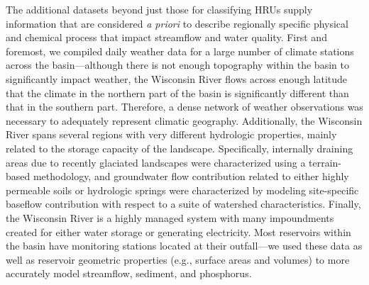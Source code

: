 The additional datasets beyond just those for classifying HRUs supply
information that are considered \textit{a priori} to describe regionally
specific physical and chemical process that impact streamflow and water quality.
First and foremost, we compiled daily weather data for a large number of climate
stations across the basin---although there is not enough topography within the
basin to significantly impact weather, the Wisconsin River flows across enough
latitude that the climate in the northern part of the basin is significantly
different than that in the southern part. Therefore, a dense network of weather
observations was necessary to adequately represent climatic geography.
Additionally, the Wisconsin River spans several regions with very different
hydrologic properties, mainly related to the storage capacity of the landscape.
Specifically, internally draining areas due to recently glaciated landscapes
were characterized using a terrain-based methodology, and groundwater flow
contribution related to either highly permeable soils or hydrologic springs were
characterized by modeling site-specific baseflow contribution with respect to a
suite of watershed characteristics. Finally, the Wisconsin River is a highly
managed system with many impoundments created for either water storage or
generating electricity. Most reservoirs within the basin have monitoring
stations located at their outfall---we used these data as well as reservoir
geometric properties (e.g., surface areas and volumes) to more accurately model
streamflow, sediment, and phosphorus.


